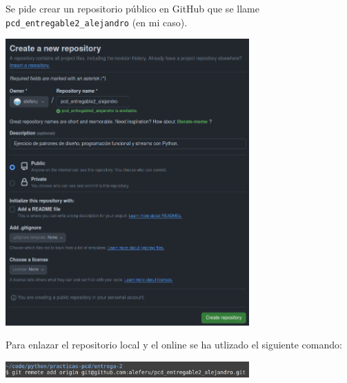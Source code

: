 Se pide crear un repositorio público en GitHub que se llame \texttt{pcd\_entregable2\_alejandro} (en mi caso).

\begin{center}
    \includegraphics[width=0.7\textwidth]{img/creacion-repositorio-online.png}
\end{center}

Para enlazar el repositorio local y el online se ha utlizado el siguiente comando:

\begin{center}
    \includegraphics[width=0.7\textwidth]{img/repositorio-local-origin.png}
\end{center}
